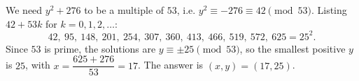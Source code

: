 We need $y^2+276$ to be a multiple of $53$, i.e. $y^2\equiv-276\equiv42\pmod{53}$. Listing $42+53k$ for $k=0,1,2,\dots$:
\[42,\ 95,\ 148,\ 201,\ 254,\ 307,\ 360,\ 413,\ 466,\ 519,\ 572,\ 625=25^2.\]
Since $53$ is prime, the solutions are $y\equiv\pm25\pmod{53}$, so the smallest positive $y$ is $25$, with $x=\dfrac{625+276}{53}=17$. The answer is $\boxed{(x,y)=(17,25)}$.
